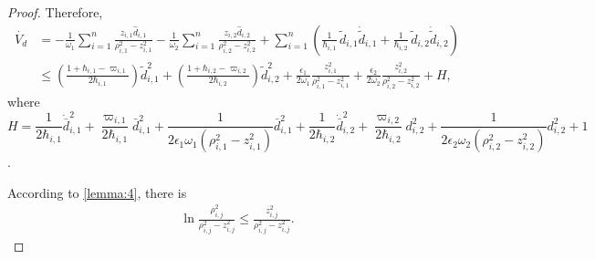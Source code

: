 \documentclass[pdflatex,sn-mathphys-num]{sn-jnl}%
\theoremstyle{thmstyleone}%
\theoremstyle{thmstyletwo}%
\theoremstyle{thmstylethree}%
\begin{document}
\begin{proof}
Therefore,
\begin{equation}\label{eq:51}
	\begin{aligned}
		\dot{V_d} & 
		= -\frac{1}{\omega_{1}}\sum_{i=1}^{n} \frac{ z_{i,1}\hat d_{i,1}}{\rho_{i,1}^2 - z_{i,1}^2} - \frac{1}{\omega_{2}}\sum_{i=1}^{n} \frac{ z_{i,2}\hat d_{i,2}}{\rho_{i,2}^2 - z_{i,2}^2}  +\sum_{i=1}^{n} \left(
			\frac{1}{\hbar_{i,1}}\,\tilde{d}_{i,1}\dot{\tilde{d}}_{i,1}
		  + \frac{1}{\hbar_{i,2}}\,\tilde{d}_{i,2}\dot{\tilde{d}}_{i,2}
	  \right)   \\   
	  &\le \left(\frac{1+\hbar_{i,1}-\varpi_{i,1}}{2\hbar_{i,1}}\right)\tilde{d}_{i,1}^2 +\left(\frac{1+\hbar_{i,2}-\varpi_{i,2}}{2\hbar_{i,2}}\right)\tilde{d}_{i,2}^2+\frac{\epsilon_1}{2 \omega_1} \frac{z_{i,1}^2}{\rho_{i,1}^2 - z_{i,1}^2}+\frac{\epsilon_2}{2 \omega_2} \frac{z_{i,2}^2}{\rho_{i,2}^2 - z_{i,2}^2}+H,
	\end{aligned}
\end{equation}
where 
\[ H = \frac{1}{2\hbar_{i,1}} \dot{\bar{{d}}}_{i,1}^2+\frac{\varpi_{i,1}}{2 \hbar_{i,1}}{\bar d}^2_{i,1}+\frac{1}{2\epsilon_1 \omega_1  (\rho_{i,1}^2 - z_{i,1}^2)} {\bar d}^2_{i,1}+ \frac{ 1}{2\hbar_{i,2}} \dot{\bar{{d}}}_{i,2}^2+\frac{\varpi_{i,2}}{2 \hbar_{i,2}}{{d}^2_{i,2}}+\frac{1}{2 \epsilon_2\omega_2  (\rho_{i,2}^2 - z_{i,2}^2)} {d}_{i,2}^2+1\].


According to \cref{lemma:4}, there is
\begin{equation}\label{eq:52}
	\begin{aligned}
		\ln\frac{\rho_{i,j}^2}{\rho_{i,j}^2-z_{i,j}^2}\le \frac{z_{i,j}^2}{\rho_{i,j}^2-z_{i,j}^2}.
	\end{aligned}
\end{equation}



\end{proof}
\end{document}

